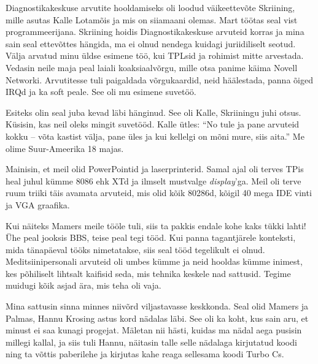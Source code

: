 
Diagnostikakeskuse arvutite hooldamiseks oli loodud väikeettevõte 
Skriining, mille asutas Kalle 
Lotamõis ja mis on siiamaani olemas. Mart töötas seal vist programmeerijana.
Skriining hoidis Diagnostika{\-}keskuse arvuteid korras ja mina sain seal ettevõttes
hängida, ma ei olnud nendega kuidagi juriidiliselt seotud. 
Välja arvatud minu üldse esimene töö, kui TPLsid ja rohimist mitte arvestada. Vedasin neile maja peal laiali koaksiaalvõrgu, mille otsa panime käima 
Novell \mbox{Networki}. Arvutitesse tuli paigaldada võrgukaardid, neid häälestada, panna 
õiged IRQd ja ka soft peale. See oli mu 
esimene suvetöö.


Esiteks olin seal juba kevad läbi hänginud. See oli 
Kalle, Skriiningu juhi otsus. 
Küsisin, kas neil oleks mingit suvetööd. Kalle ütles: \enquote{No tule ja pane 
arvuteid kokku -- võta kastist välja, pane üles ja kui kellelgi on 
mõni mure, siis aita.} Me olime Suur-Ameerika 18 majas. 

Mainisin, et meil olid PowerPointid ja laserprinterid. Samal ajal oli terves TPis heal 
juhul kümme 8086 ehk XTd ja ilmselt mustvalge 
\emph{display}'ga. Meil oli terve ruum triiki täis 
avamata arvuteid, mis olid kõik 80286d, kõigil 40 mega IDE vinti ja VGA 
graafika. 

Kui näiteks Mamers meile tööle tuli, 
siis ta pakkis endale kohe kaks tükki lahti! Ühe peal jooksis BBS, teise 
peal tegi tööd. Kui panna 
tagantjärele konteksti, mida tänapäeval tööks nimetatakse, siis seal tööd 
tegelikult ei olnud. Meditsiinipersonali arvuteid oli 
umbes kümme ja neid hooldas kümme inimest, kes põhiliselt 
lihtsalt kaifisid seda, mis tehnika keskele nad sattusid. Tegime 
muidugi kõik asjad ära, mis teha oli vaja. 

Mina sattusin sinna minnes niivõrd viljastavasse keskkonda. Seal 
olid Mamers ja Palmas, 
Hannu Krosing astus kord nädalas läbi. See oli ka 
koht, kus sain aru, et minust ei saa kunagi progejat. Mäletan nii 
hästi, kuidas ma nädal aega pusisin millegi kallal, ja siis tuli Hannu, näitasin 
talle selle nädalaga kirjutatud koodi ning ta võttis paberilehe ja 
kirjutas kahe reaga sellesama koodi Turbo Cs.

